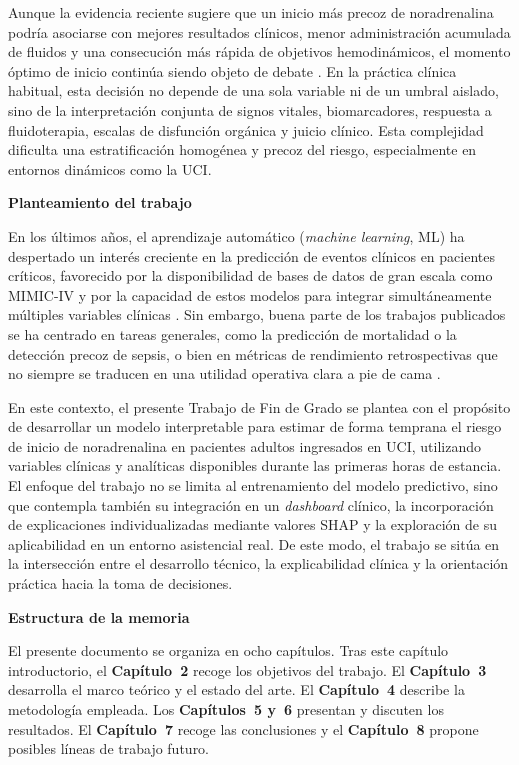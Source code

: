 Aunque la evidencia reciente sugiere que un inicio más precoz de noradrenalina podría asociarse con mejores resultados clínicos, menor administración acumulada de fluidos y una consecución más rápida de objetivos hemodinámicos, el momento óptimo de inicio continúa siendo objeto de debate \cite{shi2025,firzli2023}. En la práctica clínica habitual, esta decisión no depende de una sola variable ni de un umbral aislado, sino de la interpretación conjunta de signos vitales, biomarcadores, respuesta a fluidoterapia, escalas de disfunción orgánica y juicio clínico. Esta complejidad dificulta una estratificación homogénea y precoz del riesgo, especialmente en entornos dinámicos como la UCI.

\textbf{Planteamiento del trabajo}

En los últimos años, el aprendizaje automático (\textit{machine learning}, ML) ha despertado un interés creciente en la predicción de eventos clínicos en pacientes críticos, favorecido por la disponibilidad de bases de datos de gran escala como MIMIC-IV y por la capacidad de estos modelos para integrar simultáneamente múltiples variables clínicas \cite{johnson2023,shanmugam2025}. Sin embargo, buena parte de los trabajos publicados se ha centrado en tareas generales, como la predicción de mortalidad o la detección precoz de sepsis, o bien en métricas de rendimiento retrospectivas que no siempre se traducen en una utilidad operativa clara a pie de cama \cite{shanmugam2025,rockenschaub2025}.

En este contexto, el presente Trabajo de Fin de Grado se plantea con el propósito de desarrollar un modelo interpretable para estimar de forma temprana el riesgo de inicio de noradrenalina en pacientes adultos ingresados en UCI, utilizando variables clínicas y analíticas disponibles durante las primeras horas de estancia. El enfoque del trabajo no se limita al entrenamiento del modelo predictivo, sino que contempla también su integración en un \textit{dashboard} clínico, la incorporación de explicaciones individualizadas mediante valores SHAP y la exploración de su aplicabilidad en un entorno asistencial real. De este modo, el trabajo se sitúa en la intersección entre el desarrollo técnico, la explicabilidad clínica y la orientación práctica hacia la toma de decisiones.

\textbf{Estructura de la memoria}

El presente documento se organiza en ocho capítulos. Tras este capítulo introductorio, el \textbf{Capítulo~2} recoge los objetivos del trabajo. El \textbf{Capítulo~3} desarrolla el marco teórico y el estado del arte. El \textbf{Capítulo~4} describe la metodología empleada. Los \textbf{Capítulos~5 y~6} presentan y discuten los resultados. El \textbf{Capítulo~7} recoge las conclusiones y el \textbf{Capítulo~8} propone posibles líneas de trabajo futuro.